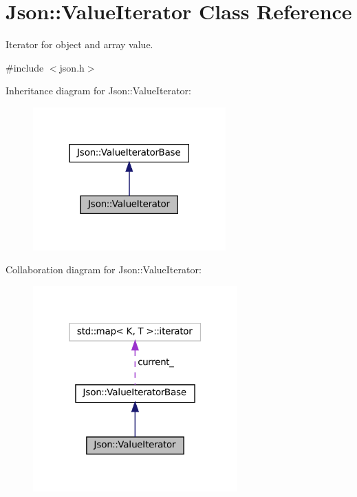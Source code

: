 \hypertarget{classJson_1_1ValueIterator}{}\section{Json\+:\+:Value\+Iterator Class Reference}
\label{classJson_1_1ValueIterator}


Iterator for object and array value.  




{\ttfamily \#include $<$json.\+h$>$}



Inheritance diagram for Json\+:\+:Value\+Iterator\+:
\nopagebreak
\begin{figure}[H]
\begin{center}
\leavevmode
\includegraphics[width=210pt]{classJson_1_1ValueIterator__inherit__graph}
\end{center}
\end{figure}


Collaboration diagram for Json\+:\+:Value\+Iterator\+:
\nopagebreak
\begin{figure}[H]
\begin{center}
\leavevmode
\includegraphics[width=223pt]{classJson_1_1ValueIterator__coll__graph}
\end{center}
\end{figure}
